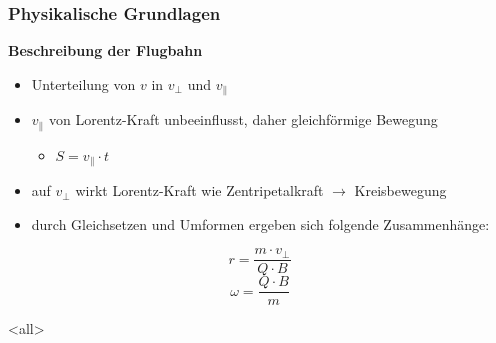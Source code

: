 \begin{frame}
  \frametitle{Physikalische Grundlagen}
  \onslide<+->
  \textbf{Beschreibung der Flugbahn}
  \begin{itemize}
    \item<+-> Unterteilung von \(v\) in \(v_\perp\) und \(v_\parallel\)
    \item<+-> \(v_\parallel\) von Lorentz-Kraft unbeeinflusst, daher gleichf\"ormige Bewegung
      \begin{itemize}
        \item<+-> \(S = v_\parallel \cdot t\)
      \end{itemize}
    \item<+-> auf \(v_\perp\) wirkt Lorentz-Kraft wie Zentripetalkraft \(\rightarrow\) Kreisbewegung
    \item<+-> durch Gleichsetzen und Umformen ergeben sich folgende Zusammenh\"ange:
  \end{itemize}
  \onslide<+->
  \begin{equation*}
    \label{eq:radius}
    r = \frac{m \cdot v_\perp}{Q \cdot B}
  \end{equation*}
  \onslide<+->
  \begin{equation*}
    \label{eq:omega}
    \omega = \frac{Q \cdot B}{m}
  \end{equation*}
\end{frame}
\mode<all>
